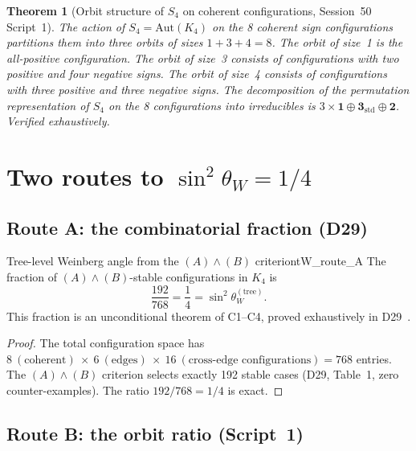 \documentclass[11pt,a4paper]{article}
\newtheorem{theorem}{Theorem}[section]
\newcommand{\Kfour}{K_4}
\newcommand{\sinW}{\sin^2\!\theta_W}
\begin{document}
\begin{theorem}[Orbit structure of $S_4$ on coherent configurations, Session~50 Script~1]
\label{thm:orbits}
The action of $S_4 = \mathrm{Aut}(\Kfour)$ on the 8 coherent sign configurations partitions them into three orbits of sizes $1 + 3 + 4 = 8$. The orbit of size~1 is the all-positive configuration. The orbit of size~3 consists of configurations with two positive and four negative signs. The orbit of size~4 consists of configurations with three positive and three negative signs. The decomposition of the permutation representation of $S_4$ on the 8 configurations into irreducibles is $3 \times \mathbf{1} \oplus \mathbf{3}_{\mathrm{std}} \oplus \mathbf{2}$. Verified exhaustively.
\end{theorem}

\section{Two routes to \texorpdfstring{$\sinW = 1/4$}{sin2(theta\_W) = 1/4}}
\label{sec:routes}

\subsection{Route A: the combinatorial fraction (D29)}
\label{subsec:routeA}

\begin{theorembox}{Tree-level Weinberg angle from the $(A)\wedge(B)$ criterion}{tW_route_A}
The fraction of $(A)\wedge(B)$-stable configurations in $\Kfour$ is
\begin{equation}
\frac{192}{768} = \frac{1}{4} = \sinW^{(\mathrm{tree})}.
\label{eq:routeA}
\end{equation}
This fraction is an unconditional theorem of C1--C4, proved exhaustively in D29~\cite{PDL_D29}.
\end{theorembox}

\begin{proof}
The total configuration space has $8\ (\text{coherent})\ \times\ 6\ (\text{edges})\ \times\ 16\ (\text{cross-edge configurations}) = 768$ entries. The $(A)\wedge(B)$ criterion selects exactly 192 stable cases (D29, Table~1, zero counter-examples). The ratio $192/768 = 1/4$ is exact.
\end{proof}

\subsection{Route B: the orbit ratio (Script~1)}
\label{subsec:routeB}
\end{document}
